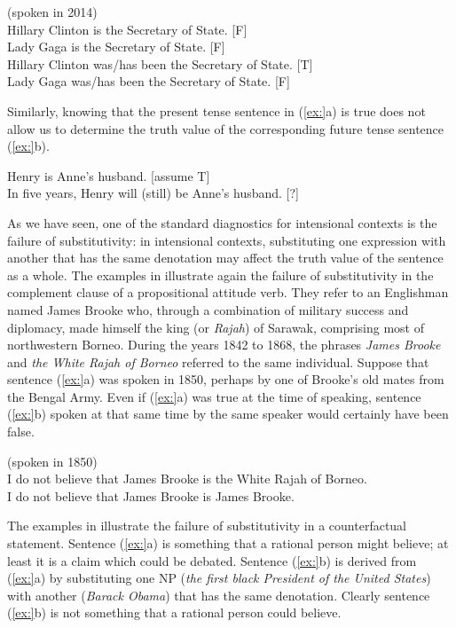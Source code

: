 \ea
(spoken in 2014)\\
\ea Hillary Clinton is the Secretary of State.  [F]\\
\ex Lady Gaga is the Secretary of State.  [F]\\
\ex Hillary Clinton was/has been the Secretary of State.  [T]\\
\ex Lady Gaga was/has been the Secretary of State.  [F]
                       \z
\z


Similarly, knowing that the present tense sentence in (\ref{ex:}a) is true does not allow us to determine the truth value of the corresponding future tense sentence (\ref{ex:}b).


\ea
\ea Henry is Anne’s husband.  [assume T]\\
\ex In five years, Henry will (still) be Anne’s husband.  [?]
                       \z
\z


As we have seen, one of the standard diagnostics for intensional contexts is the failure of substitutivity: in intensional contexts, substituting one expression with another that has the same denotation may affect the truth value of the sentence as a whole. The examples in  illustrate again the failure of substitutivity in the complement clause of a propositional attitude verb. They refer to an Englishman named James Brooke who, through a combination of military success and diplomacy, made himself the king (or \textit{Rajah}) of Sarawak, comprising most of northwestern Borneo. During the years 1842 to 1868, the phrases \textit{James Brooke} and \textit{the White Rajah of Borneo} referred to the same individual. Suppose that sentence (\ref{ex:}a) was spoken in 1850, perhaps by one of Brooke’s old mates from the Bengal Army. Even if (\ref{ex:}a) was true at the time of speaking, sentence (\ref{ex:}b) spoken at that same time by the same speaker would certainly have been false.


\ea
(spoken in 1850)\\
\ea I do not believe that James Brooke is the White Rajah of Borneo.\\
\ex I do not believe that James Brooke is James Brooke.
                       \z
\z


The examples in  illustrate the failure of substitutivity in a counterfactual statement. Sentence (\ref{ex:}a) is something that a rational person might believe; at least it is a claim which could be debated. Sentence (\ref{ex:}b) is derived from (\ref{ex:}a) by substituting one NP (\textit{the first black President of the United States}) with another (\textit{Barack Obama}) that has the same denotation. Clearly sentence (\ref{ex:}b) is not something that a rational person could believe.



